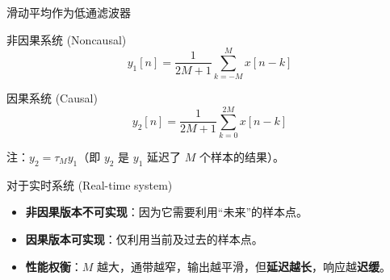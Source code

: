 \documentclass[
  ignorenonframetext,
]{beamer}
\providecommand{\tightlist}{%
  \setlength{\itemsep}{0pt}\setlength{\parskip}{0pt}}
\begin{document}
\begin{frame}{滑动平均作为低通滤波器}
\protect{}\label{ux6ed1ux52a8ux5e73ux5747ux4f5cux4e3aux4f4eux901aux6ee4ux6ce2ux5668-5}
\begin{block}{非因果系统 (Noncausal)}
\protect{}\label{ux975eux56e0ux679cux7cfbux7edf-noncausal}
\[
y_{1}[n]=\frac{1}{2 M+1} \sum_{k=-M}^{M} x[n-k]
\]
\end{block}

\begin{block}{因果系统 (Causal)}
\protect{}\label{ux56e0ux679cux7cfbux7edf-causal}
\[
y_{2}[n]=\frac{1}{2 M+1} \sum_{k=0}^{2 M} x[n-k]
\]

注：\(y_{2}=\tau_{M} y_{1}\)（即 \(y_2\) 是 \(y_1\) 延迟了 \(M\)
个样本的结果）。
\end{block}

\begin{block}{对于实时系统 (Real-time system)}
\protect{}\label{ux5bf9ux4e8eux5b9eux65f6ux7cfbux7edf-real-time-system}
\begin{itemize}
\tightlist
\item
  \textbf{非因果版本不可实现}：因为它需要利用``未来''的样本点。
\item
  \textbf{因果版本可实现}：仅利用当前及过去的样本点。
\item
  \textbf{性能权衡}：\(M\)
  越大，通带越窄，输出越平滑，但\textbf{延迟越长}，响应越\textbf{迟缓}。
\end{itemize}
\end{block}
\end{frame}
\end{document}
